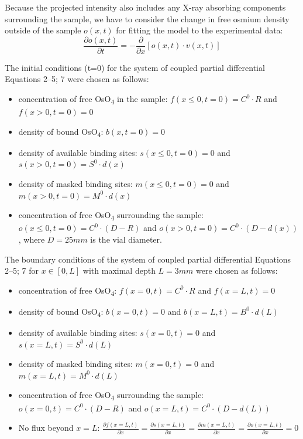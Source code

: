 \documentclass{article}
\begin{document}
Because the projected intensity also includes any X-ray absorbing components surrounding the sample, we have to consider the change in free osmium density outside of the sample $o\left(x,t\right)$ for fitting the model to the experimental data:
\begin{equation*}
\frac{\partial o(x,t)}{\partial t} = -\frac{\partial}{\partial x}\left[o\left(x,t\right)\cdot v\left(x,t\right)\right] \tag{7}
\end{equation*}

The initial conditions (t=0) for the system of coupled partial differential Equations 2–5; 7 were chosen as follows:
\begin{itemize}
\item concentration of free OsO\textsubscript{4} in the sample: $f\left(x\leq 0,t=0\right) = C^{0}\cdot R$ and $f\left(x>0,t=0\right) = 0$
\item density of bound OsO\textsubscript{4}: $b\left(x,t=0\right) = 0$
\item density of available binding sites: $s\left(x\leq 0,t=0\right) = 0$ and $s\left(x>0,t=0\right) = S^{0}\cdot d\left(x\right)$
\item density of masked binding sites: $m\left(x\leq 0,t=0\right) = 0$ and $m\left(x>0,t=0\right) = M^{0}\cdot d\left(x\right)$
\item concentration of free OsO\textsubscript{4} surrounding the sample: $o\left(x\leq 0,t=0\right) = C^{0}\cdot\left(D-R\right)$ and $o\left(x>0,t=0\right) = C^{0}\cdot\left(D-d\left(x\right)\right)$, where $D = 25mm$ is the vial diameter.
\end{itemize}

The boundary conditions of the system of coupled partial differential Equations 2–5; 7 for $x\in\left[0,L\right]$ with maximal depth $L = 3mm$ were chosen as follows:
\begin{itemize}
\item concentration of free OsO\textsubscript{4}: $f\left(x=0,t\right) = C^{0}\cdot R$ and $f\left(x=L,t\right) = 0$
\item density of bound OsO\textsubscript{4}: $b\left(x=0,t\right) = 0$ and $b\left(x=L,t\right) = B^{0}\cdot d\left(L\right)$
\item density of available binding sites: $s\left(x=0,t\right) = 0$ and $s\left(x=L,t\right) = S^{0}\cdot d\left(L\right)$
\item density of masked binding sites: $m\left(x=0,t\right) = 0$ and $m\left(x=L,t\right) = M^{0}\cdot d\left(L\right)$
\item concentration of free OsO\textsubscript{4} surrounding the sample: $o\left(x=0,t\right) = C^{0}\cdot\left(D-R\right)$ and $o\left(x=L,t\right) = C^{0}\cdot\left(D-d\left(L\right)\right)$
\item No flux beyond $x = L$: $\frac{\partial f(x=L,t)}{\partial x} = \frac{\partial s(x=L,t)}{\partial x} = \frac{\partial m(x=L,t)}{\partial x} = \frac{\partial o(x=L,t)}{\partial x} = 0$
\end{itemize}
\end{document}
